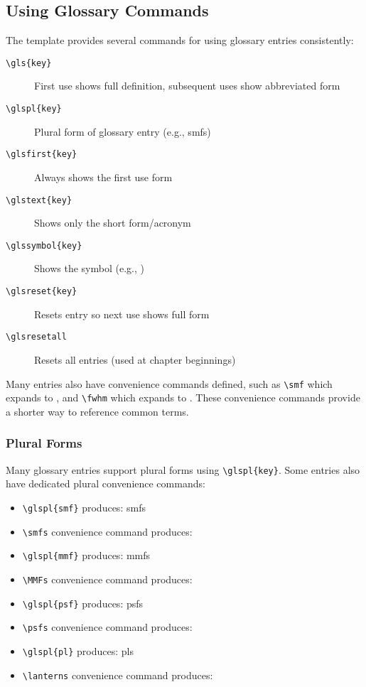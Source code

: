 \subsection{Using Glossary Commands}
\label{sect:glossary-commands}

The template provides several commands for using glossary entries consistently:

\begin{description}
    \item[\texttt{\textbackslash gls\{key\}}] First use shows full definition, subsequent uses show abbreviated form
    \item[\texttt{\textbackslash glspl\{key\}}] Plural form of glossary entry (e.g., \glspl{smf})
    \item[\texttt{\textbackslash glsfirst\{key\}}] Always shows the first use form
    \item[\texttt{\textbackslash glstext\{key\}}] Shows only the short form/acronym
    \item[\texttt{\textbackslash glssymbol\{key\}}] Shows the symbol (e.g., )
    \item[\texttt{\textbackslash glsreset\{key\}}] Resets entry so next use shows full form
    \item[\texttt{\textbackslash glsresetall}] Resets all entries (used at chapter beginnings)
\end{description}

Many entries also have convenience commands defined, such as \texttt{\textbackslash smf} which expands to \smf, and \texttt{\textbackslash fwhm} which expands to \fwhm. These convenience commands provide a shorter way to reference common terms.

\subsubsection{Plural Forms}
\label{sect:plural-forms}

Many glossary entries support plural forms using \texttt{\textbackslash glspl\{key\}}. Some entries also have dedicated plural convenience commands:

\begin{itemize}
    \item \texttt{\textbackslash glspl\{smf\}} produces: \glspl{smf}
    \item \texttt{\textbackslash smfs} convenience command produces: \smfs
    \item \texttt{\textbackslash glspl\{mmf\}} produces: \glspl{mmf}  
    \item \texttt{\textbackslash MMFs} convenience command produces: \MMFs
    \item \texttt{\textbackslash glspl\{psf\}} produces: \glspl{psf}
    \item \texttt{\textbackslash psfs} convenience command produces: \psfs
    \item \texttt{\textbackslash glspl\{pl\}} produces: \glspl{pl}
    \item \texttt{\textbackslash lanterns} convenience command produces: \lanterns
\end{itemize}

